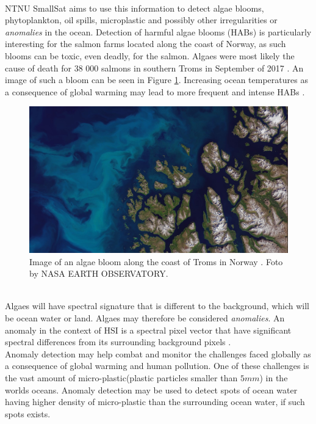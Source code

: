 \\

NTNU SmallSat aims to use this information to detect algae blooms, phytoplankton, oil spills, microplastic and possibly other irregularities or \textit{anomalies} in the ocean. Detection of harmful algae blooms (HABs) is particularly interesting for the salmon farms located along the coast of Norway, as such blooms can be toxic, even deadly, for the salmon. Algaes were most likely the cause of death for 38 000 salmons in southern Troms in September of 2017 \cite{laksedeath}. An image of such a bloom can be seen in Figure \ref{fig:algae_bloom_troms}. Increasing ocean temperatures as a consequence of global warming may lead to more frequent and intense HABs \cite{climate_change_algae_blooms}. 
\\

\begin{figure}[H]
\centering
   \includegraphics[scale=0.3]{images/algaes/algaes_northern_troms.jpg}
  \caption{ Image of an algae bloom along the coast of Troms in Norway \cite{laksedeath}. Foto by NASA EARTH OBSERVATORY. } 
  \label{fig:algae_bloom_troms}
\end{figure}
\\

Algaes will have spectral signature that is different to the background, which will be ocean water or land. Algaes may therefore be considered \textit{anomalies}. An anomaly in the context of HSI is a spectral pixel vector that have significant spectral differences from its surrounding background pixels \cite{yang2015dual}.  
\\

Anomaly detection may help combat and monitor the challenges faced globally as a consequence of global warming and human pollution. One of these challenges is the vast amount of micro-plastic(plastic particles smaller than $5mm$) in the worlds oceans. Anomaly detection may be used to detect spots of ocean water having higher density of micro-plastic than the surrounding ocean water, if such spots exists.       \\



